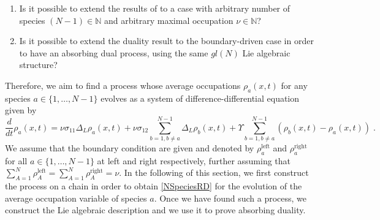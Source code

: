 \documentclass[10pt]{article}
\numberwithin{equation}{section}
\numberwithin{equation}{subsection}
\newcommand{\dt}{\;.}
\begin{document}
\begin{enumerate}
		\item Is it possible to extend the results of \cite{casini2022uphill} to a case with arbitrary number of species $(N-1)\in \mathbb{N}$ and arbitrary maximal occupation $\nu\in \mathbb{N}$?
			\item Is it possible to extend the duality result to the boundary-driven case in order to have an absorbing dual process, using the same ${gl}(N)$ Lie algebraic structure?
\end{enumerate}
Therefore, we aim to find a process whose average occupations $\rho_{a}(x,t)$ for any species $a\in\{1,\ldots,N-1\}$ evolves as a system of difference-differential equation given by 
\begin{equation}\label{NSpeciesRD}
	\frac{d}{dt} \rho_{a}(x,t)=\nu\sigma_{11}\Delta_{L}\rho_{a}(x,t)+\nu\sigma_{12}\sum_{b=1,b\neq a}^{N-1}\Delta_{L}\rho_{b}(x,t)+\Upsilon\sum_{b=1,b\neq a}^{N-1}\left(\rho_{b}(x,t)-\rho_{a}(x,t)\right)\dt
\end{equation} 
 We assume that the boundary condition are given and denoted by $\rho_{a}^{\text{left}}$ and $\rho_{a}^{\text{right}}$ for all $a\in\{1,\ldots,N-1\}$ at left and right respectively, further assuming that $\sum_{A=1}^{N}\rho_{A}^{\text{left}}=\sum_{A=1}^{N}\rho_{A}^{\text{right}}=\nu$. In the following of this section, we first construct the process on a chain in order to obtain \eqref{NSpeciesRD} for the evolution of the average occupation variable of species $a$. Once we have found such a process, we construct the Lie algebraic description and we use it to prove absorbing duality.
\end{document}
